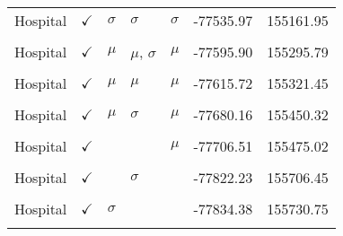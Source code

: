 \begin{table}[!h]
\begin{tabular}[t]{lllllrr}
Hospital & $\checkmark$ & $\sigma$ & $\sigma$ & $\sigma$ & -77535.97 & 155161.95\\
\cellcolor{gray!10}{Hospital} & \cellcolor{gray!10}{$\checkmark$} & \cellcolor{gray!10}{} & \cellcolor{gray!10}{} & \cellcolor{gray!10}{$\sigma$} & \cellcolor{gray!10}{-77561.32} & \cellcolor{gray!10}{155184.63}\\
Hospital & $\checkmark$ & $\mu$ & $\mu$, $\sigma$ & $\mu$ & -77595.90 & 155295.79\\
\cellcolor{gray!10}{Hospital} & \cellcolor{gray!10}{$\checkmark$} & \cellcolor{gray!10}{$\sigma$} & \cellcolor{gray!10}{$\mu$, $\sigma$} & \cellcolor{gray!10}{$\mu$} & \cellcolor{gray!10}{-77596.80} & \cellcolor{gray!10}{155297.60}\\
Hospital & $\checkmark$ & $\mu$ & $\mu$ & $\mu$ & -77615.72 & 155321.45\\
\cellcolor{gray!10}{Hospital} & \cellcolor{gray!10}{$\checkmark$} & \cellcolor{gray!10}{$\sigma$} & \cellcolor{gray!10}{$\mu$} & \cellcolor{gray!10}{$\mu$} & \cellcolor{gray!10}{-77616.98} & \cellcolor{gray!10}{155323.96}\\
Hospital & $\checkmark$ & $\mu$ & $\sigma$ & $\mu$ & -77680.16 & 155450.32\\
\cellcolor{gray!10}{Hospital} & \cellcolor{gray!10}{$\checkmark$} & \cellcolor{gray!10}{$\sigma$} & \cellcolor{gray!10}{$\sigma$} & \cellcolor{gray!10}{$\mu$} & \cellcolor{gray!10}{-77681.18} & \cellcolor{gray!10}{155452.35}\\
Hospital & $\checkmark$ &  &  & $\mu$ & -77706.51 & 155475.02\\
\cellcolor{gray!10}{Hospital} & \cellcolor{gray!10}{$\checkmark$} & \cellcolor{gray!10}{} & \cellcolor{gray!10}{$\mu$} & \cellcolor{gray!10}{} & \cellcolor{gray!10}{-77756.14} & \cellcolor{gray!10}{155574.27}\\
Hospital & $\checkmark$ &  & $\sigma$ &  & -77822.23 & 155706.45\\
\cellcolor{gray!10}{Hospital} & \cellcolor{gray!10}{$\checkmark$} & \cellcolor{gray!10}{$\mu$} & \cellcolor{gray!10}{} & \cellcolor{gray!10}{} & \cellcolor{gray!10}{-77833.38} & \cellcolor{gray!10}{155728.77}\\
Hospital & $\checkmark$ & $\sigma$ &  &  & -77834.38 & 155730.75\\
\cellcolor{gray!10}{ICU} & \cellcolor{gray!10}{$\checkmark$} & \cellcolor{gray!10}{} & \cellcolor{gray!10}{$\mu$, $\sigma$} & \cellcolor{gray!10}{$\mu$} & \cellcolor{gray!10}{-8683.10} & \cellcolor{gray!10}{17436.20}\\

\end{tabular}
\end{table}
